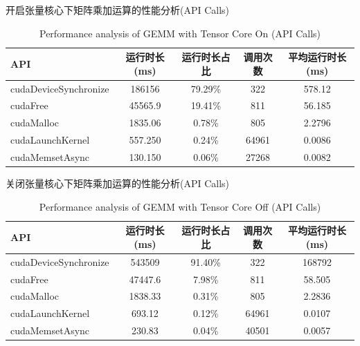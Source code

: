 \begin{table}
	\centering
	\renewcommand{\thetable}{\arabic{section}-\arabic{table} }
	\renewcommand{\tablename}{表}
	\caption{开启张量核心下矩阵乘加运算的性能分析(API Calls)}
	\addtocounter{table}{-1}
	\renewcommand{\thetable}{\arabic{section}-\arabic{table} }
	\renewcommand{\tablename}{Table}
	\caption{Performance analysis of GEMM with Tensor Core On (API Calls)}
	\begin{tabular}{lcccc}
		\toprule
		API & 运行时长(ms) & 运行时长占比 & 调用次数 & 平均运行时长(ms)\\
		\midrule
		cudaDeviceSynchronize & 186156 & 79.29\% & 322 & 578.12\\
		cudaFree & 45565.9 & 19.41\% & 811 & 56.185\\
		cudaMalloc & 1835.06 & 0.78\% & 805 & 2.2796\\
		cudaLaunchKernel & 557.250 & 0.24\% & 64961 & 0.0086\\
		cudaMemsetAsync & 130.150 & 0.06\% & 27268 & 0.0082\\
		\bottomrule
	\end{tabular} \label{table-GEMMPROFTF} 
\end{table}
\begin{table}
	\centering
	\renewcommand{\thetable}{\arabic{section}-\arabic{table} }
	\renewcommand{\tablename}{表}
	\caption{关闭张量核心下矩阵乘加运算的性能分析(API Calls)}
	\addtocounter{table}{-1}
	\renewcommand{\thetable}{\arabic{section}-\arabic{table} }
	\renewcommand{\tablename}{Table}
	\caption{Performance analysis of GEMM with Tensor Core Off (API Calls)}
	\begin{tabular}{lcccc}
		\toprule
		API & 运行时长(ms) & 运行时长占比 & 调用次数 & 平均运行时长(ms)\\
		\midrule
		cudaDeviceSynchronize & 543509 & 91.40\% & 322 & 168792\\
		cudaFree & 47447.6 & 7.98\% & 811 & 58.505\\
		cudaMalloc & 1838.33 & 0.31\% & 805 & 2.2836\\
		cudaLaunchKernel & 693.12 & 0.12\% & 64961 & 0.0107\\
		cudaMemsetAsync & 230.83 & 0.04\% & 40501 & 0.0057\\
		\bottomrule
	\end{tabular} \label{table-GEMMPROFNOTF} 
\end{table}

